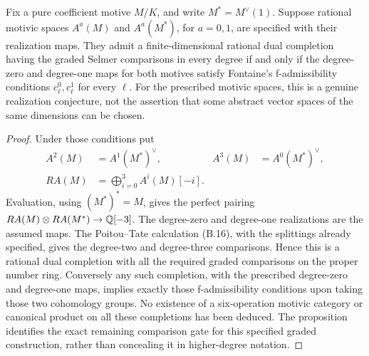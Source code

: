 \begin{proposition}
\label{prop:B-general-rational-gate}
Fix a pure coefficient motive \(M/K\), and write
\(M^*=M^\vee(1)\).  Suppose rational motivic spaces
\(A^a(M)\) and \(A^a(M^*)\), for \(a=0,1\), are specified
with their realization maps.  They admit a finite-dimensional
rational dual completion having the graded Selmer comparisons
in every degree if and only if the degree-zero and degree-one
maps for both motives satisfy Fontaine's f-admissibility
conditions \(c^0_\ell,c^1_\ell\) for every \(\ell\).
For the prescribed motivic spaces, this is a genuine realization
conjecture, not the assertion that some abstract vector spaces of
the same dimensions can be chosen.
\end{proposition}
\begin{proof}
Under those conditions put
\[
\begin{aligned}
 A^2(M)&=A^1(M^*)^\vee,&
 A^3(M)&=A^0(M^*)^\vee,\\
 R A(M)&=\bigoplus_{i=0}^3 A^i(M)[-i].
\end{aligned}
\]
Evaluation, using \((M^*)^*=M\), gives the perfect pairing
\(RA(M)\otimes RA(M^*)\to\mathbb Q[-3]\).
The degree-zero and degree-one realizations are the assumed
maps.  The Poitou--Tate calculation (B.16), with the splittings
already specified, gives the degree-two and degree-three
comparisons.  Hence this is a rational dual completion with all
the required graded comparisons on the proper number ring.
Conversely any such completion, with the prescribed degree-zero
and degree-one maps, implies exactly those f-admissibility
conditions upon taking those two cohomology groups.  No existence
of a six-operation motivic category or canonical product on all
these completions has been deduced.  The proposition identifies
the exact remaining comparison gate for this specified graded
construction, rather than concealing it in higher-degree notation.
\end{proof}
